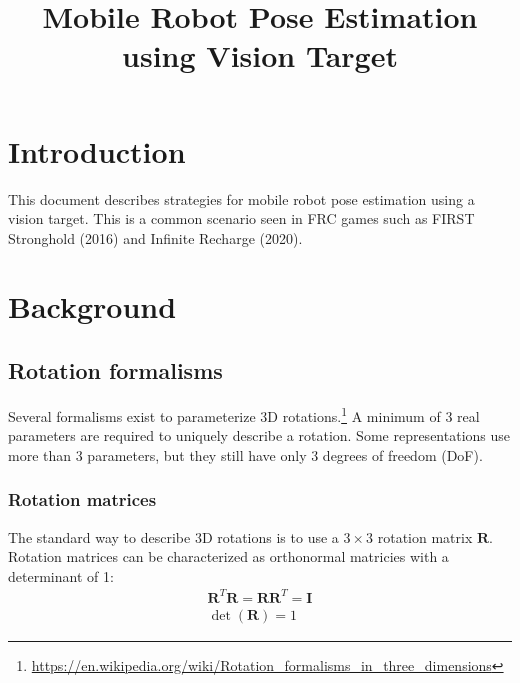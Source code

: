 \documentclass{article}
\title{Mobile Robot Pose Estimation using Vision Target\vspace{-2em}}
\author{}
\date{}
\begin{document}
\maketitle

\section{Introduction}

This document describes strategies for mobile robot pose estimation using a vision target. This is a common scenario seen in FRC games such as FIRST Stronghold (2016) and Infinite Recharge (2020).

\section{Background}
\subsection{Rotation formalisms}
Several formalisms exist to parameterize 3D rotations.\footnote{\url{https://en.wikipedia.org/wiki/Rotation_formalisms_in_three_dimensions}} A minimum of 3 real parameters are required to uniquely describe a rotation. Some representations use more than 3 parameters, but they still have only 3 degrees of freedom (DoF).

\subsubsection{Rotation matrices}
The standard way to describe 3D rotations is to use a $3 \times 3$ rotation matrix $\mathbf{R}$. Rotation matrices can be characterized as orthonormal matricies with a determinant of 1:
\begin{gather*}
    \mathbf{R}^T\mathbf{R}=\mathbf{R}\mathbf{R}^T=\mathbf{I} \\
    \det(\mathbf{R}) = 1
\end{gather*}
\end{document}
